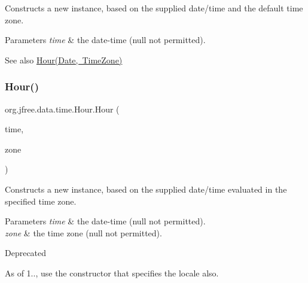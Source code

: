 Constructs a new instance, based on the supplied date/time and the default time zone.


\begin{DoxyParams}{Parameters}
{\em time} & the date-\/time ({\ttfamily null} not permitted).\\
\hline
\end{DoxyParams}
\begin{DoxySeeAlso}{See also}
\mbox{\hyperlink{classorg_1_1jfree_1_1data_1_1time_1_1_hour_a39484e8aba4992be74cf5a69d8b1f86e}{Hour(\+Date, Time\+Zone)}} 
\end{DoxySeeAlso}
\mbox{\label{classorg_1_1jfree_1_1data_1_1time_1_1_hour_a39484e8aba4992be74cf5a69d8b1f86e}} 
\subsubsection{\texorpdfstring{Hour()}{Hour()}\hspace{0.1cm}{\footnotesize\ttfamily [5/6]}}
{\footnotesize\ttfamily org.\+jfree.\+data.\+time.\+Hour.\+Hour (\begin{DoxyParamCaption}\item[{Date}]{time,  }\item[{Time\+Zone}]{zone }\end{DoxyParamCaption})}

Constructs a new instance, based on the supplied date/time evaluated in the specified time zone.


\begin{DoxyParams}{Parameters}
{\em time} & the date-\/time ({\ttfamily null} not permitted). \\
\hline
{\em zone} & the time zone ({\ttfamily null} not permitted).\\
\hline
\end{DoxyParams}
\begin{DoxyRefDesc}{Deprecated}
\item[\mbox{\hyperlink{deprecated__deprecated000266}{Deprecated}}]As of 1.., use the constructor that specifies the locale also. \end{DoxyRefDesc}
\mbox{\label{classorg_1_1jfree_1_1data_1_1time_1_1_hour_a95089caa6309be1da0cd6e46e54ab66a}} 
